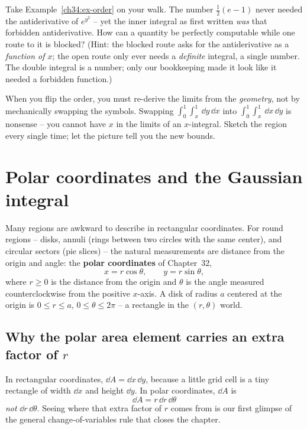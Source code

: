 \begin{walkbox}
Take Example~\ref{ch34:ex-order} on your walk. The number $\tfrac12(e-1)$ never
needed the antiderivative of $e^{y^2}$ -- yet the inner integral as first written
\emph{was} that forbidden antiderivative. How can a quantity be perfectly
computable while one route to it is blocked? (Hint: the blocked route asks for
the antiderivative as a \emph{function of $x$}; the open route only ever needs a
\emph{definite} integral, a single number. The double integral is a number; only
our bookkeeping made it look like it needed a forbidden function.)
\end{walkbox}

\begin{trapbox}
When you flip the order, you must re-derive the limits from the \emph{geometry},
not by mechanically swapping the symbols. Swapping
$\int_0^1\!\int_x^1\,\dd y\,\dd x$ into $\int_0^1\!\int_x^1\,\dd x\,\dd y$ is
nonsense -- you cannot have $x$ in the limits of an $x$-integral. Sketch the
region every single time; let the picture tell you the new bounds.
\end{trapbox}

\section{Polar coordinates and the Gaussian integral}
\label{ch34:polar}

Many regions are awkward to describe in rectangular coordinates. For round
regions -- disks, annuli (rings between two circles with the same center), and
circular sectors (pie slices) -- the natural measurements are distance from the
origin and angle: the \textbf{polar coordinates} of Chapter~32,
\[
  x=r\cos\theta,\qquad y=r\sin\theta,
\]
where $r\ge 0$ is the distance from the origin and $\theta$ is the angle measured
counterclockwise from the positive $x$-axis. A disk of radius $a$ centered at the
origin is $0\le r\le a$, $0\le\theta\le 2\pi$ -- a rectangle in the
$(r,\theta)$ world.

\subsection{Why the polar area element carries an extra factor of $r$}

In rectangular
coordinates, $\dd A=\dd x\,\dd y$, because a little grid cell is a tiny rectangle
of width $\dd x$ and height $\dd y$. In polar coordinates, $\dd A$ is
\[
  \boxed{\;\dd A=r\,\dd r\,\dd\theta\;}
\]
\emph{not} $\dd r\,\dd\theta$. Seeing where that extra factor of $r$ comes from
is our first glimpse of the general change-of-variables rule that closes the
chapter.

